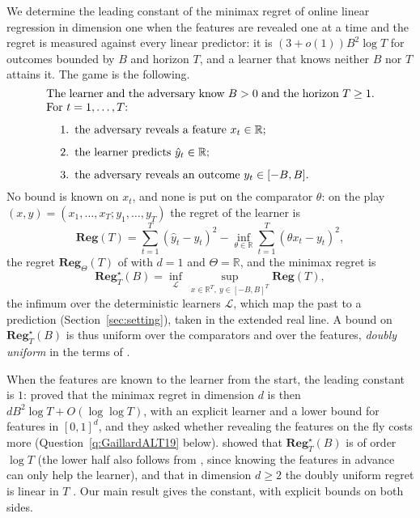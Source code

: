 \documentclass[12pt]{amsart}
\theoremstyle{definition}
\numberwithin{equation}{section}
\newcommand{\R}{\mathbb{R}}
\newcommand{\Reg}{\mathbf{Reg}}
\newcommand{\Regs}{\mathbf{Reg}^{\star}}
\newcommand{\yh}{\hat y}
\begin{document}
We determine the leading constant of the minimax regret of online linear regression in dimension one when the features are revealed one at a time and the regret is measured against every linear predictor: it is $(3+o(1))B^2\log T$ for outcomes bounded by $B$ and horizon $T$, and a learner that knows neither $B$ nor $T$ attains it. The game is the following.
\begin{equation}\label{eq:protocol}
\begin{minipage}{0.84\textwidth}
The learner and the adversary know $B>0$ and the horizon $T\ge1$. For $t=1,\dots,T$:
\begin{enumerate}
\item the adversary reveals a feature $x_t\in\R$;
\item the learner predicts $\yh_t\in\R$;
\item the adversary reveals an outcome $y_t\in[-B,B]$.
\end{enumerate}
\end{minipage}
\end{equation}
No bound is known on $x_t$, and none is put on the comparator $\theta$: on the play $(x,y)=(x_1,\dots,x_T;y_1,\dots,y_T)$ the regret of the learner is
\begin{equation}\label{eq:regret}
\Reg(T)=\sum_{t=1}^T(\yh_t-y_t)^2-\inf_{\theta\in\R}\sum_{t=1}^T(\theta x_t-y_t)^2,
\end{equation}
the regret $\Reg_\Theta(T)$ of \citet[Section~2.1]{CQRZ} with $d=1$ and $\Theta=\R$, and the minimax regret is
\begin{equation}\label{eq:minimax}
\Regs_T(B)=\inf_{\mathcal L}\ \sup_{x\in\R^T,\ y\in[-B,B]^T}\Reg(T),
\end{equation}
the infimum over the deterministic learners $\mathcal L$, which map the past to a prediction (Section~\ref{sec:setting}), taken in the extended real line. A bound on $\Regs_T(B)$ is thus uniform over the comparators and over the features, \emph{doubly uniform} in the terms of \citet[Section~4.1]{GaillardALT19}.

When the features are known to the learner from the start, the leading constant is $1$: \citet[Theorems~7 and~4]{GaillardALT19} proved that the minimax regret in dimension $d$ is then $dB^2\log T+O(\log\log T)$, with an explicit learner and a lower bound for features in $[0,1]^d$, and they asked whether revealing the features on the fly costs more (Question~\ref{q:GaillardALT19} below). \citet[Theorem~5 and Proposition~6]{CQRZ} showed that $\Regs_T(B)$ is of order $\log T$ (the lower half also follows from \citet[Theorem~4]{GaillardALT19}, since knowing the features in advance can only help the learner), and that in dimension $d\ge2$ the doubly uniform regret is linear in $T$ \citep[Theorem~7]{CQRZ}. Our main result gives the constant, with explicit bounds on both sides.
\end{document}
